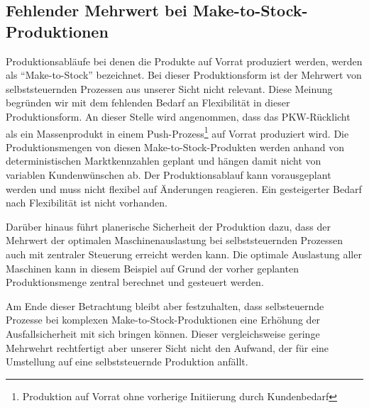\subsection{Fehlender Mehrwert bei Make-to-Stock-Produktionen}
\label{sec:GrenzenMakeToStock}

Produktionsabläufe bei denen die Produkte auf Vorrat produziert werden, werden
als "`Make-to-Stock"' bezeichnet. Bei dieser Produktionsform ist der Mehrwert von
selbststeuernden Prozessen aus unserer Sicht nicht relevant. Diese Meinung
begründen wir mit dem fehlenden Bedarf an Flexibilität in dieser
Produktionsform. An dieser Stelle wird angenommen, dass das PKW-Rücklicht als
ein Massenprodukt in einem Push-Prozess\footnote{Produktion auf Vorrat ohne
vorherige Initiierung durch Kundenbedarf} auf Vorrat produziert wird. Die Produktionsmengen von diesen Make-to-Stock-Produkten werden anhand von
deterministischen Marktkennzahlen geplant und hängen damit nicht von variablen
Kundenwünschen ab. Der Produktionsablauf kann vorausgeplant werden und muss
nicht flexibel auf Änderungen reagieren. Ein gesteigerter Bedarf nach
Flexibilität ist nicht vorhanden.

Darüber hinaus führt planerische Sicherheit der Produktion dazu, dass der
Mehrwert der optimalen Maschinenauslastung bei selbststeuernden Prozessen auch
mit zentraler Steuerung erreicht werden kann. Die optimale Auslastung aller
Maschinen kann in diesem Beispiel auf Grund der vorher geplanten
Produktionsmenge zentral berechnet und gesteuert werden.

Am Ende dieser Betrachtung bleibt aber festzuhalten, dass selbsteuernde
Prozesse bei komplexen Make-to-Stock-Produktionen eine Erhöhung der
Ausfallsicherheit mit sich bringen können. Dieser vergleichsweise geringe
Mehrwehrt rechtfertigt aber unserer Sicht nicht den Aufwand, der für eine
Umstellung auf eine selbststeuernde Produktion anfällt.
